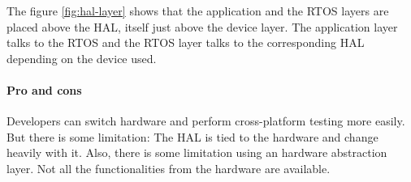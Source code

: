 The figure \ref{fig:hal-layer} shows that the application and the RTOS layers are placed above the HAL, itself just above the device layer.
The application layer talks to the RTOS and the RTOS layer talks to the corresponding HAL depending on the device used.


\paragraph{Pro and cons}
Developers can switch hardware and perform cross-platform testing more easily.
But there is some limitation: The HAL is tied to the hardware and change heavily with it.
Also, there is some limitation using an hardware abstraction layer.
Not all the functionalities from the hardware are available.